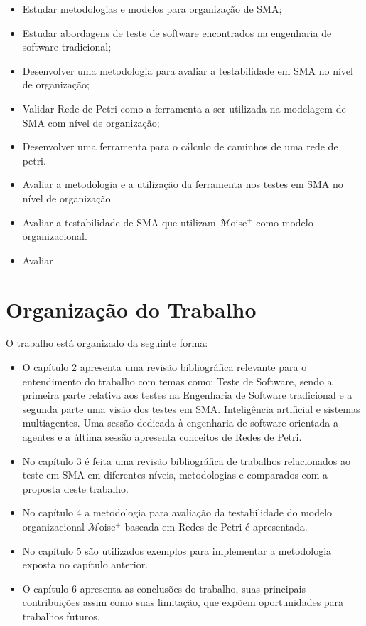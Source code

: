 \begin{itemize}

\item Estudar metodologias e modelos para organização de SMA;
\item Estudar abordagens de teste de software encontrados na engenharia de software tradicional;
\item Desenvolver uma metodologia para avaliar a testabilidade em SMA no nível de organização;
\item Validar Rede de Petri como a ferramenta a ser utilizada na modelagem de SMA com nível de organização;
\item Desenvolver uma ferramenta para o cálculo de caminhos de uma rede de petri.
\item Avaliar a metodologia e a utilização da ferramenta nos testes em SMA no nível de organização.
\item Avaliar a testabilidade de SMA que utilizam $\mathcal{M}$oise$^{+}$ como modelo organizacional.

\item Avaliar 


\end{itemize}


\section{Organização do Trabalho}

O trabalho está organizado da seguinte forma:

\begin{itemize}
\item O capítulo 2 apresenta uma revisão bibliográfica relevante para o entendimento do trabalho com temas como: Teste de Software, sendo a primeira parte relativa aos testes na Engenharia de Software tradicional e a segunda parte uma visão dos testes em SMA. Inteligência artificial e sistemas multiagentes. Uma sessão dedicada à engenharia de software orientada a agentes e a última sessão apresenta conceitos de Redes de Petri.

\item No capítulo 3 é feita uma revisão bibliográfica de trabalhos relacionados ao teste em SMA em diferentes níveis, metodologias e comparados com a proposta deste trabalho.

\item No capítulo 4 a metodologia para avaliação da testabilidade do modelo organizacional $\mathcal{M}$oise$^{+}$ baseada em Redes de Petri é apresentada.

\item No capítulo 5 são utilizados exemplos para implementar a metodologia exposta no capítulo anterior.

\item O capítulo 6 apresenta as conclusões do trabalho, suas principais contribuições assim como suas limitação, que expõem oportunidades para trabalhos futuros.
\end{itemize}

